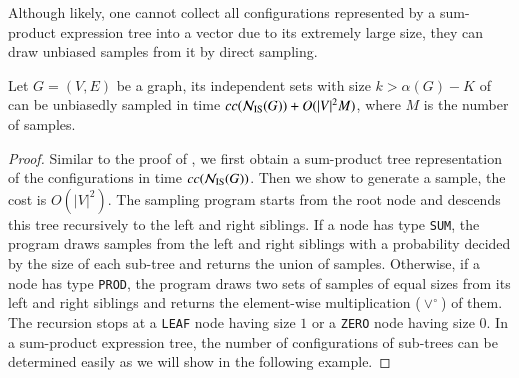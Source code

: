\documentclass[review, onefignum, onetabnum]{siamart190516}
\begin{document}
Although likely, one cannot collect all configurations represented by a sum-product expression tree into a vector due to its extremely large size,
they can draw unbiased samples from it by direct sampling.
\begin{theorem}
    Let $G = (V, E)$ be a graph, its independent sets with size $k > \alpha(G)-K$ of can be unbiasedly sampled in time $cc({\mathcal{N}_{\rm IS}(G)}) + O(|V|^2 M)$, where $M$ is the number of samples.
\end{theorem}
\begin{proof}
Similar to the proof of , we first obtain a sum-product tree representation of the configurations in time $cc({\mathcal{N}_{\rm IS}(G)})$.
Then we show to generate a sample, the cost is $O(|V|^2)$.
The sampling program starts from the root node and descends this tree recursively to the left and right siblings.
If a node has type \texttt{SUM}, the program draws samples from the left and right siblings with a probability decided by the size of each sub-tree and returns the union of samples.
Otherwise, if a node has type \texttt{PROD}, the program draws two sets of samples of equal sizes from its left and right siblings and returns the element-wise multiplication ($\lor^\circ$) of them.
The recursion stops at a \texttt{LEAF} node having size $1$ or a \texttt{ZERO} node having size $0$.
In a sum-product expression tree, the number of configurations of sub-trees can be determined easily as we will show in the following example.
\end{proof}
\end{document}
